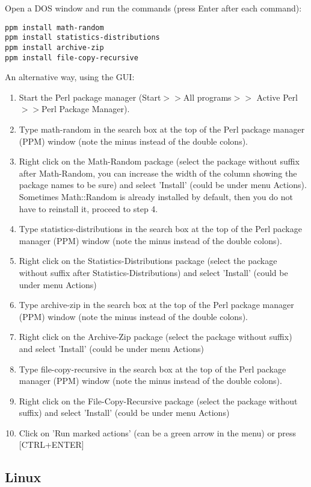 \documentclass[a4paper,12pt]{article}
\begin{document}
Open a DOS window and run the commands (press Enter after each command):
\begin{verbatim}
ppm install math-random
ppm install statistics-distributions
ppm install archive-zip
ppm install file-copy-recursive
\end{verbatim}
An alternative way, using the GUI:

\begin{enumerate}
\item Start the Perl package manager (Start$>>$All programs$>>$ Active Perl$>>$Perl Package Manager).
\item Type math-random in the search box at the top of the Perl package manager (PPM) window (note the minus instead of the double colons). 
\item Right click on the Math-Random package (select the package without suffix after Math-Random, you can increase the width of the column showing the package names to be sure) and select 'Install' (could be under menu Actions). Sometimes Math::Random is already installed by default, then you do not have to reinstall it, proceed to step 4.
\item Type statistics-distributions in the search box at the top of the Perl package manager (PPM) window (note the minus instead of the double colons). 
\item Right click on the Statistics-Distributions package (select the package without suffix after Statistics-Distributions) and select 'Install' (could be under menu Actions)
\item Type archive-zip in the search box at the top of the Perl package manager (PPM) window (note the minus instead of the double colons). 
\item Right click on the Archive-Zip package (select the package without suffix) and select 'Install' (could be under menu Actions)
\item Type file-copy-recursive in the search box at the top of the Perl package manager (PPM) window (note the minus instead of the double colons). 
\item Right click on the File-Copy-Recursive package (select the package without suffix) and select 'Install' (could be under menu Actions)
\item Click on 'Run marked actions' (can be a green arrow in the menu) or press [CTRL+ENTER]
\end{enumerate}


\subsection{Linux}
\end{document}
